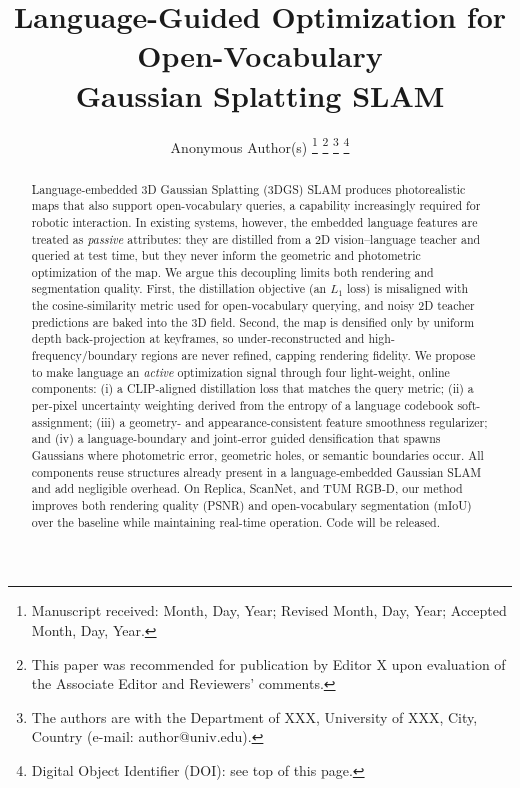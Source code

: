 \documentclass[10pt, journal]{IEEEtran}
\begin{document}
\title{Language-Guided Optimization for Open-Vocabulary \\ Gaussian Splatting SLAM}

\author{Anonymous Author(s)%
\thanks{Manuscript received: Month, Day, Year; Revised Month, Day, Year; Accepted Month, Day, Year.}
\thanks{This paper was recommended for publication by Editor X upon evaluation of the Associate Editor and Reviewers' comments.}
\thanks{The authors are with the Department of XXX, University of XXX, City, Country (e-mail: author@univ.edu).}
\thanks{Digital Object Identifier (DOI): see top of this page.}}


\maketitle

\begin{abstract}
Language-embedded 3D Gaussian Splatting (3DGS) SLAM produces photorealistic maps
that also support open-vocabulary queries, a capability increasingly required for
robotic interaction. In existing systems, however, the embedded language features
are treated as \emph{passive} attributes: they are distilled from a 2D
vision--language teacher and queried at test time, but they never inform the
geometric and photometric optimization of the map. We argue this decoupling
limits both rendering and segmentation quality. First, the distillation objective
(an $L_1$ loss) is misaligned with the cosine-similarity metric used for
open-vocabulary querying, and noisy 2D teacher predictions are baked into the 3D
field. Second, the map is densified only by uniform depth back-projection at
keyframes, so under-reconstructed and high-frequency/boundary regions are never
refined, capping rendering fidelity. We propose to make language an \emph{active}
optimization signal through four light-weight, online components: (i) a
CLIP-aligned distillation loss that matches the query metric; (ii) a per-pixel
uncertainty weighting derived from the entropy of a language codebook
soft-assignment; (iii) a geometry- and appearance-consistent feature smoothness
regularizer; and (iv) a language-boundary and joint-error guided densification
that spawns Gaussians where photometric error, geometric holes, or semantic
boundaries occur. All components reuse structures already present in a
language-embedded Gaussian SLAM and add negligible overhead. On Replica, ScanNet,
and TUM RGB-D, our method improves both rendering quality (PSNR) and
open-vocabulary segmentation (mIoU) over the baseline while maintaining real-time
operation. Code will be released.
\end{abstract}
\end{document}
